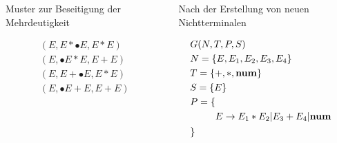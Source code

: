 \documentclass[t]{beamer}
\begin{document}
    \begin{frame}
        \vspace{-1em}
        \begin{columns}[T]
            \begin{column}{0.33\textwidth}
                \centering
                \begin{block}{Muster zur Beseitigung der Mehrdeutigkeit}
                    \begin{minipage}[t][7.5cm]{\linewidth}
                        \vspace{-1em}
                        \begin{align*}
                        (E, E*\bullet{E}, E*E)
                            \\
                            (E, \bullet{E}*E, E+E) \\
                            (E, E+\bullet{E}, E*E) \\
                            (E, \bullet{E}+E, E+E)
                        \end{align*}
                    \end{minipage}
                \end{block}
            \end{column}
            \begin{column}{0.45\textwidth}
                \centering
                \begin{block}{Nach der Erstellung von neuen Nichtterminalen}
                    \begin{minipage}[t]{\linewidth}
                        \vspace{-1em}
                        \begin{align*}
                            & G(N,T,P,S) \\
                            & N = \{E, E_1, E_2, E_3, E_4\} \\
                            & T = \{+, *, \bold{num}\} \\
                            & S = \{E\} \\
                            & P = \{ \begin{aligned}[t]
                                         \\
                                         E &\rightarrow E_1 * E_2 | E_3 + E_4 | \bold{num} \\
                            \end{aligned} \\
                            & \}
                        \end{align*}
                    \end{minipage}
                \end{block}
            \end{column}
        \end{columns}
    \end{frame}
\end{document}
